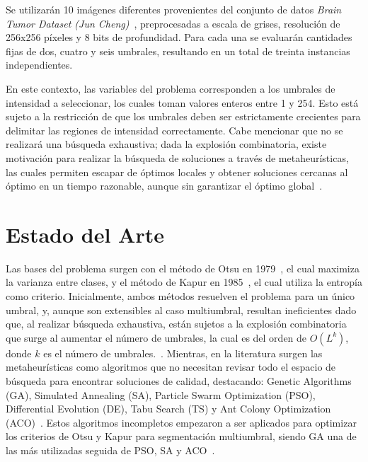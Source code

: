 \documentclass[letter, 10pt]{article}
\begin{document}
Se utilizar\'an 10 im\'agenes diferentes provenientes del conjunto de datos \textit{Brain Tumor Dataset (Jun Cheng)}~\cite{Cheng2017BrainTumor}, preprocesadas a escala de grises, resoluci\'on de 256x256 p\'ixeles y 8 bits de profundidad. Para cada una se evaluar\'an cantidades fijas de dos, cuatro y seis umbrales, resultando en un total de treinta instancias independientes.

En este contexto, las variables del problema corresponden a los umbrales de intensidad a seleccionar, los cuales toman valores enteros entre 1 y 254. Esto est\'a sujeto a la restricci\'on de que los umbrales deben ser estrictamente crecientes para delimitar las regiones de intensidad correctamente.
Cabe mencionar que no se realizar\'a una b\'usqueda exhaustiva; dada la explosi\'on combinatoria, existe motivaci\'on para realizar la b\'usqueda de soluciones a trav\'es de metaheur\'isticas, las cuales permiten escapar de \'optimos locales y obtener soluciones cercanas al \'optimo en un tiempo razonable,
aunque sin garantizar el \'optimo global~\cite{Hammouche2010Comparative, Lameesa2024Role}.

\section{Estado del Arte}

Las bases del problema surgen con el m\'etodo de Otsu en 1979~\cite{Otsu1979}, el cual maximiza la varianza entre clases, y el m\'etodo de Kapur en 1985~\cite{Kapur1985}, el cual utiliza la entrop\'ia como criterio.
Inicialmente, ambos m\'etodos resuelven el problema para un \'unico umbral, y, aunque son extensibles al caso multiumbral, resultan ineficientes dado que, al realizar b\'usqueda exhaustiva,
est\'an sujetos a la explosi\'on combinatoria que surge al aumentar el n\'umero de umbrales, la cual es del orden de $O(L^{k})$, donde $k$ es el n\'umero de umbrales.~\cite{Manikandan2014Multilevel, Hammouche2010Comparative}.
Mientras, en la literatura surgen las metaheur\'isticas como algoritmos que no necesitan revisar todo el espacio de b\'usqueda para encontrar soluciones de calidad, destacando:
Genetic Algorithms (GA), Simulated Annealing (SA), Particle Swarm Optimization (PSO), Differential Evolution (DE), Tabu Search (TS) y Ant Colony Optimization (ACO)~\cite{Hammouche2010Comparative}.
Estos algoritmos incompletos empezaron a ser aplicados para optimizar los criterios de Otsu y Kapur para segmentaci\'on multiumbral,
siendo GA una de las m\'as utilizadas seguida de PSO, SA y ACO~\cite{Hammouche2010Comparative}.
\end{document}
